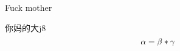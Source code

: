 \documentclass[UTF8]{ctexart}
\begin{document}
Fuck mother
\par
你妈的大j8
\begin{equation}
    \pagestyle{plain}
    \alpha = \beta * \gamma
\end{equation}
\end{document}
